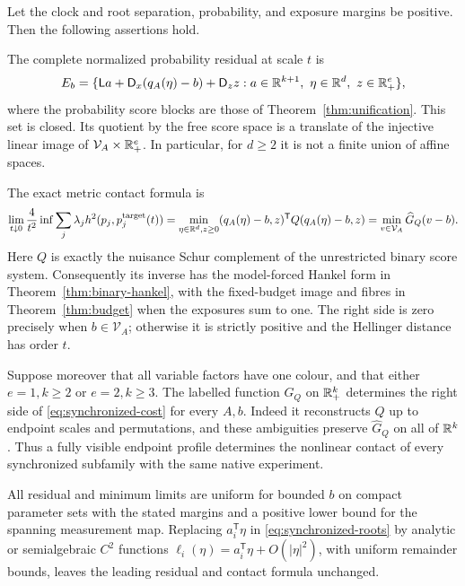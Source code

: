 \begin{theorem}\label{thm:synchronized}
Let the clock and root separation, probability, and exposure margins be positive. Then the following assertions hold.

The complete normalized probability residual at scale $t$ is
\begin{equation}\label{eq:synchronized-E}
 E_b=\{\mathsf La+\mathsf D_x(q_A(\eta)-b)+\mathsf D_z z:
 a\in\mathbb R^{k+1},\ \eta\in\mathbb R^d,\ z\in\mathbb R_+^e\},
\end{equation}
where the probability score blocks are those of Theorem~\ref{thm:unification}. This set is closed. Its quotient by the free score space is a translate of the injective linear image of $\mathcal V_A\times\mathbb R_+^e$. In particular, for $d\ge2$ it is not a finite union of affine spaces.

The exact metric contact formula is
\begin{equation}\label{eq:synchronized-cost}
 \lim_{t\downarrow0}\frac4{t^2}\inf
 \sum_j\lambda_j h^2(p_j,p_j^{\rm target}(t))
 =\min_{\eta\in\mathbb R^d,z\ge0}(q_A(\eta)-b,z)^{\mathsf T}Q(q_A(\eta)-b,z)
 =\min_{v\in\mathcal V_A}\widehat G_Q(v-b).
\end{equation}
Here $Q$ is exactly the nuisance Schur complement of the unrestricted binary score system. Consequently its inverse has the model-forced Hankel form in Theorem~\ref{thm:binary-hankel}, with the fixed-budget image and fibres in Theorem~\ref{thm:budget} when the exposures sum to one. The right side is zero precisely when $b\in\mathcal V_A$; otherwise it is strictly positive and the Hellinger distance has order $t$.

Suppose moreover that all variable factors have one colour, and that either $e=1,k\ge2$ or $e=2,k\ge3$. The labelled function $G_Q$ on $\mathbb R_+^k$ determines the right side of \eqref{eq:synchronized-cost} for every $A,b$. Indeed it reconstructs $Q$ up to endpoint scales and permutations, and these ambiguities preserve $\widehat G_Q$ on all of $\mathbb R^k$. Thus a fully visible endpoint profile determines the nonlinear contact of every synchronized subfamily with the same native experiment.

All residual and minimum limits are uniform for bounded $b$ on compact parameter sets with the stated margins and a positive lower bound for the spanning measurement map. Replacing $a_i^{\mathsf T}\eta$ in \eqref{eq:synchronized-roots} by analytic or semialgebraic $C^2$ functions $\ell_i(\eta)=a_i^{\mathsf T}\eta+O(|\eta|^2)$, with uniform remainder bounds, leaves the leading residual and contact formula unchanged.
\end{theorem}
